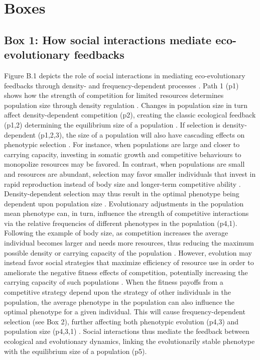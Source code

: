 \documentclass{article}
\begin{document}
	\newpage
	
	\section{Boxes}
	
	\subsection{Box 1: How social interactions mediate eco-evolutionary feedbacks}
	\setcounter{figure}{0} 
	
	\noindent Figure B.1 depicts the role of social interactions in mediating eco-evolutionary feedbacks through density- and frequency-dependent processes \citep{Engen2020}. Path 1 (p1) shows how the strength of competition for limited resources determines population size through density regulation \citep{Gilpin1973a}. Changes in population size in turn affect density-dependent competition (p2), creating the classic ecological feedback (p1,2) determining the equilibrium size of a population \citep{Travis2013}. If selection is density-dependent (p1,2,3), the size of a population will also have cascading effects on phenotypic selection  \citep{Mueller1997, Boyce1984}. For instance, when populations are large and closer to carrying capacity, investing in somatic growth and competitive behaviours to monopolize resources may be favored. In contrast, when populations are small and resources are abundant, selection may favor smaller individuals that invest in rapid reproduction instead of body size and longer-term competitive ability \citep{Joshi2001, Wright2018, Engen2017}. Density-dependent selection may thus result in the optimal phenotype being dependent upon population size \citep{Anderson1971, Charlesworth1971}. Evolutionary adjustments in the population mean phenotype can, in turn, influence the strength of competitive interactions via the relative frequencies of different phenotypes in the population \citep{Wright1969} (p4,1). Following the example of body size, as competition increases the average individual becomes larger and needs more resources, thus reducing the maximum possible density or carrying capacity of the population \citep{Engen2020}. However, evolution may instead favor social strategies that maximize efficiency of resource use in order to ameliorate the negative fitness effects of competition, potentially increasing the carrying capacity of such populations \citep{macarthur1967theory,  Boyce1984}. When the fitness payoffs from a competitive strategy depend upon the strategy of other individuals in the population, the average phenotype in the population can also influence the optimal phenotype for a given individual. This will cause frequency-dependent selection (see Box 2), further affecting both phenotypic evolution (p4,3) \citep{Heino1998} and population size (p4,3,1) \citep{Svensson2018}. Social interactions thus mediate the feedback between ecological and evolutionary dynamics, linking the evolutionarily stable phenotype with the equilibrium size of a population (p5).
	
\end{document}
